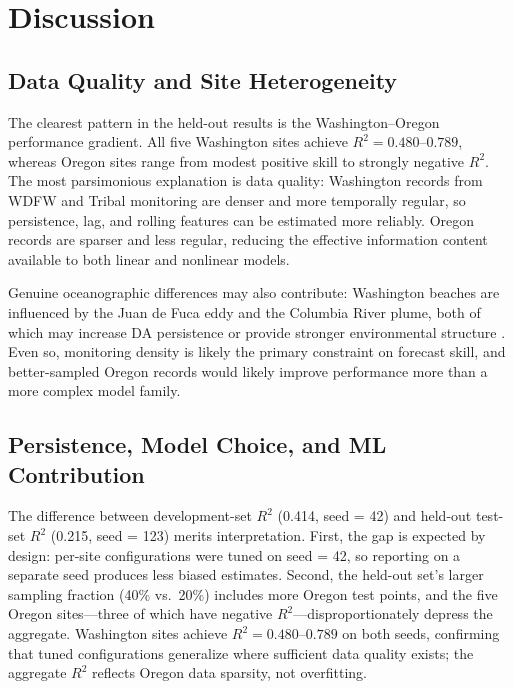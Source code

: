 \documentclass[toxins,article,submit,moreauthors]{Definitions/mdpi}
\begin{document}
\section{Discussion}
\label{sec:discussion}

\subsection{Data Quality and Site Heterogeneity}

The clearest pattern in the held-out results is the Washington--Oregon performance gradient. All five Washington sites achieve $R^2 = 0.480$--$0.789$, whereas Oregon sites range from modest positive skill to strongly negative $R^2$. The most parsimonious explanation is data quality: Washington records from WDFW and Tribal monitoring are denser and more temporally regular, so persistence, lag, and rolling features can be estimated more reliably. Oregon records are sparser and less regular, reducing the effective information content available to both linear and nonlinear models.

Genuine oceanographic differences may also contribute: Washington beaches are influenced by the Juan de Fuca eddy and the Columbia River plume, both of which may increase DA persistence or provide stronger environmental structure \cite{Trainer2009, McCabe2023}. Even so, monitoring density is likely the primary constraint on forecast skill, and better-sampled Oregon records would likely improve performance more than a more complex model family.

\subsection{Persistence, Model Choice, and ML Contribution}

The difference between development-set $R^2$ (0.414, seed = 42) and held-out test-set $R^2$ (0.215, seed = 123) merits interpretation. First, the gap is expected by design: per-site configurations were tuned on seed = 42, so reporting on a separate seed produces less biased estimates. Second, the held-out set's larger sampling fraction (40\% vs.\ 20\%) includes more Oregon test points, and the five Oregon sites---three of which have negative $R^2$---disproportionately depress the aggregate. Washington sites achieve $R^2 = 0.480$--$0.789$ on both seeds, confirming that tuned configurations generalize where sufficient data quality exists; the aggregate $R^2$ reflects Oregon data sparsity, not overfitting.
\end{document}
